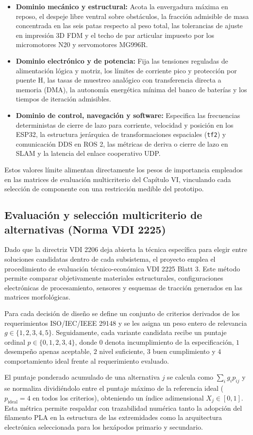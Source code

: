 \begin{itemize}
    \item \textbf{Dominio mecánico y estructural:} Acota la envergadura máxima en reposo, el despeje libre ventral sobre obstáculos, la fracción admisible de masa concentrada en las seis patas respecto al peso total, las tolerancias de ajuste en impresión 3D FDM y el techo de par articular impuesto por los micromotores N20 y servomotores MG996R.
    \item \textbf{Dominio electrónico y de potencia:} Fija las tensiones reguladas de alimentación lógica y motriz, los límites de corriente pico y protección por puente H, las tasas de muestreo analógico con transferencia directa a memoria (DMA), la autonomía energética mínima del banco de baterías y los tiempos de iteración admisibles.
    \item \textbf{Dominio de control, navegación y software:} Especifica las frecuencias deterministas de cierre de lazo para corriente, velocidad y posición en los ESP32, la estructura jerárquica de transformaciones espaciales (\texttt{tf2}) y comunicación DDS en ROS 2, las métricas de deriva o cierre de lazo en SLAM y la latencia del enlace cooperativo UDP.
\end{itemize}

Estos valores límite alimentan directamente los pesos de importancia empleados en las matrices de evaluación multicriterio del Capítulo VI, vinculando cada selección de componente con una restricción medible del prototipo.


\subsection{Evaluación y selección multicriterio de alternativas (Norma VDI 2225)}

Dado que la directriz VDI 2206 deja abierta la técnica específica para elegir entre soluciones candidatas dentro de cada subsistema, el proyecto emplea el procedimiento de evaluación técnico-económica VDI 2225 Blatt 3. Este método permite comparar objetivamente materiales estructurales, configuraciones electrónicas de procesamiento, sensores y esquemas de tracción generados en las matrices morfológicas.

Para cada decisión de diseño se define un conjunto de criterios derivados de los requerimientos ISO/IEC/IEEE 29148 y se les asigna un peso entero de relevancia $g \in \{1, 2, 3, 4, 5\}$. Seguidamente, cada variante candidata recibe un puntaje ordinal $p \in \{0, 1, 2, 3, 4\}$, donde $0$ denota incumplimiento de la especificación, $1$ desempeño apenas aceptable, $2$ nivel suficiente, $3$ buen cumplimiento y $4$ comportamiento ideal frente al requerimiento evaluado.

El puntaje ponderado acumulado de una alternativa $j$ se calcula como $\sum_i g_i p_{ij}$ y se normaliza dividiéndolo entre el puntaje máximo de la referencia ideal ($p_{\text{ideal}} = 4$ en todos los criterios), obteniendo un índice adimensional $X_j \in [0, 1]$. Esta métrica permite respaldar con trazabilidad numérica tanto la adopción del filamento PLA en la estructura de las extremidades como la arquitectura electrónica seleccionada para los hexápodos primario y secundario.
